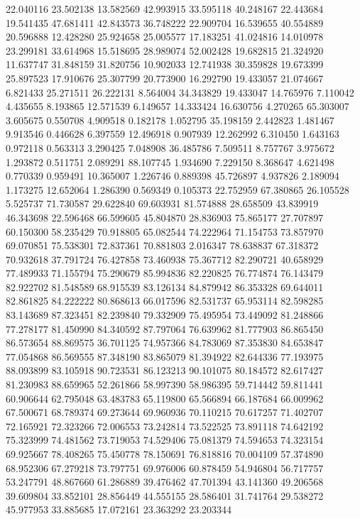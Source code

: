 22.040116
23.502138
13.582569
42.993915
33.595118
40.248167
22.443684
19.541435
47.681411
42.843573
36.748222
22.909704
16.539655
40.554889
20.596888
12.428280
25.924658
25.005577
17.183251
41.024816
14.010978
23.299181
33.614968
15.518695
28.989074
52.002428
19.682815
21.324920
11.637747
31.848159
31.820756
10.902033
12.741938
30.359828
19.673399
25.897523
17.910676
25.307799
20.773900
16.292790
19.433057
21.074667
6.821433
25.271511
26.222131
8.564004
34.343829
19.433047
14.765976
7.110042
4.435655
8.193865
12.571539
6.149657
14.333424
16.630756
4.270265
65.303007
3.605675
0.550708
4.909518
0.182178
1.052795
35.198159
2.442823
1.481467
9.913546
0.446628
6.397559
12.496918
0.907939
12.262992
6.310450
1.643163
0.972118
0.563313
3.290425
7.048908
36.485786
7.509511
8.757767
3.975672
1.293872
0.511751
2.089291
88.107745
1.934690
7.229150
8.368647
4.621498
0.770339
0.959491
10.365007
1.226746
0.889398
45.726897
4.937826
2.189094
1.173275
12.652064
1.286390
0.569349
0.105373
22.752959
67.380865
26.105528
5.525737
71.730587
29.622840
69.603931
81.574888
28.658509
43.839919
46.343698
22.596468
66.599605
45.804870
28.836903
75.865177
27.707897
60.150300
58.235429
70.918805
65.082544
74.222964
71.154753
73.857970
69.070851
75.538301
72.837361
70.881803
2.016347
78.638837
67.318372
70.932618
37.791724
76.427858
73.460938
75.367712
82.290721
40.658929
77.489933
71.155794
75.290679
85.994836
82.220825
76.774874
76.143479
82.922702
81.548589
68.915539
83.126134
84.879942
86.353328
69.644011
82.861825
84.222222
80.868613
66.017596
82.531737
65.953114
82.598285
83.143689
87.323451
82.239840
79.332909
75.495954
73.449092
81.248866
77.278177
81.450990
84.340592
87.797064
76.639962
81.777903
86.865450
86.573654
88.869575
36.701125
74.957366
84.783069
87.353830
84.653847
77.054868
86.569555
87.348190
83.865079
81.394922
82.644336
77.193975
88.093899
83.105918
90.723531
86.123213
90.101075
80.184572
82.617427
81.230983
88.659965
52.261866
58.997390
58.986395
59.714442
59.811441
60.906644
62.795048
63.483783
65.119800
65.566894
66.187684
66.009962
67.500671
68.789374
69.273644
69.960936
70.110215
70.617257
71.402707
72.165921
72.323266
72.006553
73.242814
73.522525
73.891118
74.642192
75.323999
74.481562
73.719053
74.529406
75.081379
74.594653
74.323154
69.925667
78.408265
75.450778
78.150691
76.818816
70.004109
57.374890
68.952306
67.279218
73.797751
69.976006
60.878459
54.946804
56.717757
53.247791
48.867660
61.286889
39.476462
47.701394
43.141360
49.206568
39.609804
33.852101
28.856449
44.555155
28.586401
31.741764
29.538272
45.977953
33.885685
17.072161
23.363292
23.203344
